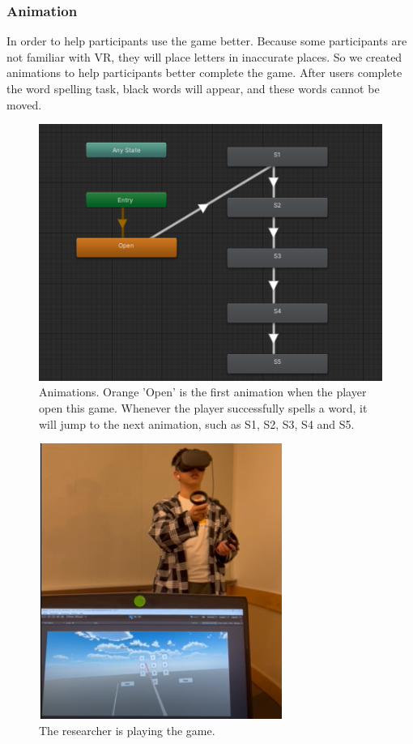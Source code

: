\documentclass{vgtc}                          %
\begin{document}
\subsubsection{Animation}
In order to help participants use the game better. Because some participants are not familiar with VR, they will place letters in inaccurate places. So we created animations to help participants better complete the game. After users complete the word spelling task, black words will appear, and these words cannot be moved.
\begin{figure}[H]
 \centering
 \includegraphics[width=\columnwidth]{pictures/animation.png}
 \caption{Animations. Orange 'Open' is the first animation when the player open this game. Whenever the player successfully spells a word, it will jump to the next animation, such as S1, S2, S3, S4 and S5.}
 \label{fig:9}
 
\end{figure}
\begin{figure}[H]
 \centering
 \includegraphics[width=8cm, height=9cm]{pictures/playthegame.png}
 \caption{The researcher is playing the game.}
 \label{fig:playthegame}
\end{figure}
\end{document}
